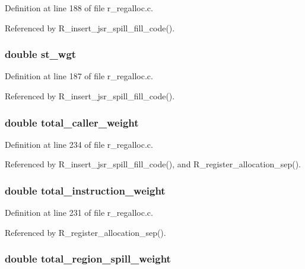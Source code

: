Definition at line 188 of file r\_\-regalloc.c.

Referenced by R\_\-insert\_\-jsr\_\-spill\_\-fill\_\-code().
\subsubsection{\setlength{\rightskip}{0pt plus 5cm}double \bf{st\_\-wgt}}\label{r__regalloc_8h_ca0a0b44fc8d6a56b9f78ce8c60170ca}




Definition at line 187 of file r\_\-regalloc.c.

Referenced by R\_\-insert\_\-jsr\_\-spill\_\-fill\_\-code().
\subsubsection{\setlength{\rightskip}{0pt plus 5cm}double \bf{total\_\-caller\_\-weight}}\label{r__regalloc_8h_79eb96ea76194350e245f552d858ae95}




Definition at line 234 of file r\_\-regalloc.c.

Referenced by R\_\-insert\_\-jsr\_\-spill\_\-fill\_\-code(), and R\_\-register\_\-allocation\_\-sep().
\subsubsection{\setlength{\rightskip}{0pt plus 5cm}double \bf{total\_\-instruction\_\-weight}}\label{r__regalloc_8h_c643820fe073dfd44fb62a6430595b9c}




Definition at line 231 of file r\_\-regalloc.c.

Referenced by R\_\-register\_\-allocation\_\-sep().
\subsubsection{\setlength{\rightskip}{0pt plus 5cm}double \bf{total\_\-region\_\-spill\_\-weight}}\label{r__regalloc_8h_438ba5d7669773a5742206bd31674ecb}




